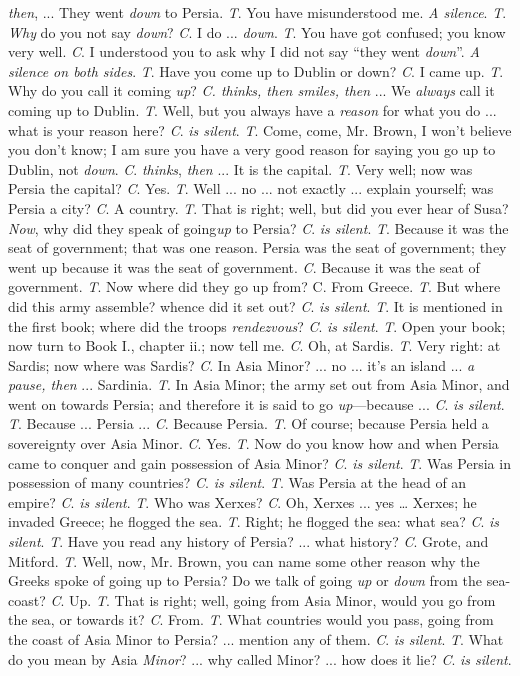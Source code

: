 \emph{then}, ... They went \emph{down} to Persia.
\emph{T}. You have misunderstood me.
\emph{A silence}.
\emph{T}. \emph{Why} do you not say \emph{down}? \emph{C}. I do ... \emph{down}.
\emph{T}. You have got confused; you know very well. \emph{C}. I
understood you to ask why I did not say ``they went \emph{down}''.
\emph{A silence on both sides}.
\emph{T}. Have you come up to Dublin or down? \emph{C}. I came up.
\emph{T}. Why do you call it coming \emph{up}? \emph{C. thinks, then
smiles, then} ... We \emph{always} call it coming up to Dublin.
\emph{T}. Well, but you always have a \emph{reason} for what you do
... what is your reason here? \emph{C}. \emph{is silent}.
\emph{T}. Come, come, Mr. Brown, I won't believe you don't know; I am
sure you have a very good reason for saying you go up to Dublin, not \emph{down}.
\emph{C}. \emph{thinks}, \emph{then} ... It is the capital.
\emph{T}. Very well; now was Persia the capital? \emph{C}. Yes.
\emph{T}. Well ... no ... not exactly ... explain yourself; was Persia
a city? \emph{C}. A country.
\emph{T}. That is right; well, but did you ever hear of Susa? \emph{Now},
why did they speak of going\emph{up} to Persia? \emph{C}. \emph{is
silent}.
\emph{T}. Because it was the seat of government; that was one reason.
Persia was the seat of government; they went up because it was the
seat of government. \emph{C}. Because it was the seat of government.
\emph{T}. Now where did they go up from? C. From Greece.
\emph{T}. But where did this army assemble? whence did it set out? \emph{C}.
\emph{is silent}.
\emph{T}. It is mentioned in the first book; where did the troops \emph{rendezvous}?
\emph{C}. \emph{is silent}. \emph{T}. Open your book; now turn to Book I., chapter ii.; now tell
me. \emph{C}. Oh, at Sardis.
\emph{T}. Very right: at Sardis; now where was Sardis? \emph{C}. In
Asia Minor? ... no ... it's an island ... \emph{a pause, then} ...
Sardinia.
\emph{T}. In Asia Minor; the army set out from Asia Minor, and went on
towards Persia; and therefore it is said to go \emph{up}—because ...
\emph{C}. \emph{is silent}.
\emph{T}. Because ... Persia ... \emph{C}. Because Persia.
\emph{T}. Of course; because Persia held a sovereignty over Asia
Minor. \emph{C}. Yes.
\emph{T}. Now do you know how and when Persia came to conquer and gain
possession of Asia Minor? \emph{C}. \emph{is silent}.
\emph{T}. Was Persia in possession of many countries? \emph{C}. \emph{is
silent}.
\emph{T}. Was Persia at the head of an empire? \emph{C}. \emph{is silent}.
\emph{T}. Who was Xerxes? \emph{C}. Oh, Xerxes ... yes … Xerxes; he
invaded Greece; he flogged the sea.
\emph{T}. Right; he flogged the sea: what sea? \emph{C}. \emph{is silent}.
\emph{T}. Have you read any history of Persia? ... what history? \emph{C}.
Grote, and Mitford.
\emph{T}. Well, now, Mr. Brown, you can name some other reason why the
Greeks spoke of going up to Persia? Do we talk of going \emph{up} or \emph{down}
from the sea-coast? \emph{C}. Up.
\emph{T}. That is right; well, going from Asia Minor, would you go
from the sea, or towards it? \emph{C}. From.
\emph{T}. What countries would you pass, going from the coast of Asia
Minor to Persia? ... mention any of them. \emph{C}. \emph{is silent}.
\emph{T}. What do you mean by Asia \emph{Minor}? ... why called Minor?
... how does it lie? \emph{C}. \emph{is silent}.

